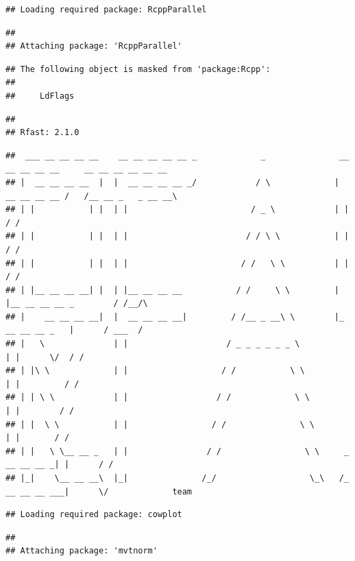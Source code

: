 \documentclass[
]{article}
\begin{document}
\begin{verbatim}
## Loading required package: RcppParallel
\end{verbatim}

\begin{verbatim}
## 
## Attaching package: 'RcppParallel'
\end{verbatim}

\begin{verbatim}
## The following object is masked from 'package:Rcpp':
## 
##     LdFlags
\end{verbatim}

\begin{verbatim}
## 
## Rfast: 2.1.0
\end{verbatim}

\begin{verbatim}
##  ___ __ __ __ __    __ __ __ __ __ _             _               __ __ __ __ __     __ __ __ __ __ __   
## |  __ __ __ __  |  |  __ __ __ __ _/            / \             |  __ __ __ __ /   /__ __ _   _ __ __\  
## | |           | |  | |                         / _ \            | |                        / /          
## | |           | |  | |                        / / \ \           | |                       / /          
## | |           | |  | |                       / /   \ \          | |                      / /          
## | |__ __ __ __| |  | |__ __ __ __           / /     \ \         | |__ __ __ __ _        / /__/\          
## |    __ __ __ __|  |  __ __ __ __|         / /__ _ __\ \        |_ __ __ __ _   |      / ___  /           
## |   \              | |                    / _ _ _ _ _ _ \                     | |      \/  / /       
## | |\ \             | |                   / /           \ \                    | |         / /          
## | | \ \            | |                  / /             \ \                   | |        / /          
## | |  \ \           | |                 / /               \ \                  | |       / /          
## | |   \ \__ __ _   | |                / /                 \ \     _ __ __ __ _| |      / /          
## |_|    \__ __ __\  |_|               /_/                   \_\   /_ __ __ __ ___|      \/             team
\end{verbatim}

\begin{verbatim}
## Loading required package: cowplot
\end{verbatim}

\begin{verbatim}
## 
## Attaching package: 'mvtnorm'
\end{verbatim}
\end{document}
